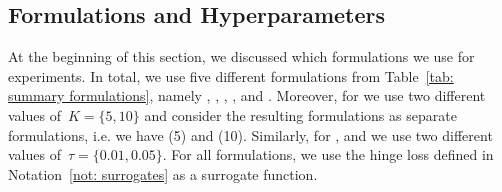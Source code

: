 \subsection{Formulations and Hyperparameters}

At the beginning of this section, we discussed which formulations we use for experiments. In total, we use five different formulations from Table~\ref{tab: summary formulations}, namely \TopPush, \TopPushK, \GrillNP, \tauFPL, and \PatMatNP. Moreover, for \TopPushK we use two different values of~$K = \{5, 10\}$ and consider the resulting formulations as separate formulations, i.e. we have \TopPushK(5) and \TopPushK(10). Similarly, for \GrillNP, \tauFPL and \PatMat we use two different values of~$\tau = \{0.01, 0.05\}.$ For all formulations, we use the hinge loss defined in Notation~\ref{not: surrogates} as a surrogate function.

